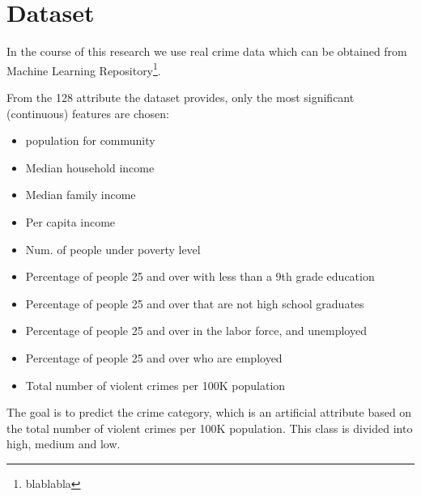 \section{Dataset}

In the course of this research we use real crime data which can be obtained from Machine Learning Repository\footnote{blablabla}.

From the 128 attribute the dataset provides, only the most significant (continuous) features are chosen:

\begin{itemize}
	\setlength{\itemsep}{-2pt}
	\item population for community
	\item Median household income
	\item Median family income
	\item Per capita income
	\item Num. of people under poverty level
	\item Percentage of people 25 and over with less than a 9th grade education
	\item Percentage of people 25 and over that are not high school graduates
	\item Percentage of people 25 and over in the labor force, and unemployed
	\item Percentage of people 25 and over who are employed
	\item Total number of violent crimes per 100K population
\end{itemize}

The goal is to predict the crime category, which is an artificial attribute based on the total number of violent crimes per 100K population. This class is divided into high, medium and low. 